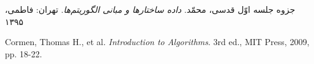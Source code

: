 

\begin{thebibliography}{99}
	جزوه جلسه اوّل
	قدسی، محمّد. \textit{داده ساختارها و مبانی الگوریتم‌ها}. تهران: فاطمی، ۱۳۹۵
	
	\begin{latin}	%
		
		Cormen, Thomas H., et al.
		\textit{Introduction to Algorithms}. 
		3rd ed., MIT Press, 2009, pp. 18-22. %
	\end{latin}	
\end{thebibliography}
